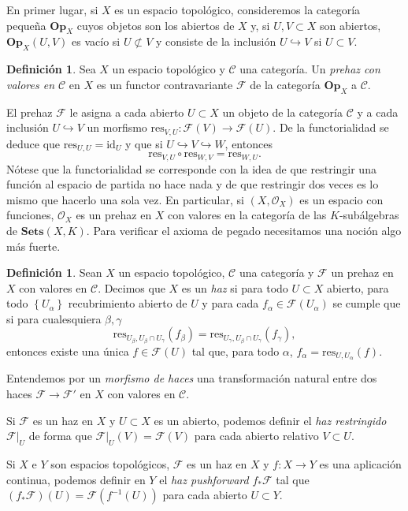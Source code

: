 \documentclass[12pt,a4paper]{article}
\theoremstyle{definition} \newtheorem{defn}[thm]{Definición}
\theoremstyle{definition} \newtheorem{ejemplo}[thm]{Ejemplo}
\theoremstyle{definition} \newtheorem{ejercicio}[thm]{Ejercicio}
\theoremstyle{remark} \newtheorem*{obs}{Observación}
\def\CC{\mathscr{C}}
\def\FF{\mathscr{F}}
\def\res{\mathrm{res}}
\def\OO{\mathscr{O}}
\begin{document}
	En primer lugar, si $X$ es un espacio topológico, consideremos la categoría pequeña $\mathbf{Op}_X$ cuyos objetos son los abiertos de $X$ y, si $U, V \subset X$ son abiertos, $\mathbf{Op}_X(U,V)$ es vacío si $U\not\subset V$ y consiste de la inclusión $U\hookrightarrow V$ si $U\subset V$.
	\begin{defn}
	  Sea $X$ un espacio topológico y $\CC$ una categoría. Un \emph{prehaz con valores en $\CC$} en $X$ es un functor contravariante $\FF$ de la categoría $\mathbf{Op}_X$ a $\CC$. 
	\end{defn}
	El prehaz $\FF$ le asigna a cada abierto $U\subset X$ un objeto de la categoría $\CC$ y a cada inclusión $U\hookrightarrow V$ un morfismo $\res_{V,U}:\FF(V)\rightarrow \FF(U)$. De la functorialidad se deduce que $\res_{U,U}=\mathrm{id}_U$ y que si $U\hookrightarrow V \hookrightarrow W$, entonces 
	\begin{equation*}
	  \res_{V,U}\circ \res_{W,V}=\res_{W,U}.
	\end{equation*}
	Nótese que la functorialidad se corresponde con la idea de que restringir una función al espacio de partida no hace nada y de que restringir dos veces es lo mismo que hacerlo una sola vez. En particular, si $(X,\OO_X)$ es un espacio con funciones, $\OO_X$ es un prehaz en $X$ con valores en la categoría de las $K$-subálgebras de $\mathbf{Sets}(X,K)$. Para verificar el axioma de pegado necesitamos una noción algo más fuerte.
	\begin{defn}
	  Sean $X$ un espacio topológico, $\CC$ una categoría y $\FF$ un prehaz en $X$ con valores en $\CC$. Decimos que $X$ es un \emph{haz} si para todo $U\subset X$ abierto, para todo $\left\{ U_{\alpha} \right\}$ recubrimiento abierto de $U$ y para cada $f_{\alpha}\in \FF(U_{\alpha})$ se cumple que si para cualesquiera $\beta,\gamma$
	  \begin{equation*}
	    \res_{U_{\beta},U_{\beta}\cap U_{\gamma}}(f_{\beta})=\res_{U_{\gamma},U_{\beta}\cap U_{\gamma}}(f_{\gamma}),
	  \end{equation*}
	  entonces existe una única $f\in \FF(U)$ tal que, para todo $\alpha$, $f_{\alpha}=\res_{U,U_{\alpha}}(f)$.

	  Entendemos por un \emph{morfismo de haces} una transformación natural entre dos haces $\FF\rightarrow \FF'$ en $X$ con valores en $\CC$.

	  Si $\FF$ es un haz en $X$ y $U\subset X$ es un abierto, podemos definir el \emph{haz restringido} $\FF|_{U}$ de forma que $\FF|_{U}(V)=\FF(V)$ para cada abierto relativo $V\subset U$.

	  Si $X$ e $Y$ son espacios topológicos, $\FF$ es un haz en $X$ y $f:X\rightarrow Y$ es una aplicación continua, podemos definir en $Y$ el \emph{haz pushforward} $f_*\FF$ tal que $(f_*\FF) (U)=\FF(f^{-1}\left( U \right))$ para cada abierto $U\subset Y$.
	\end{defn}
\end{document}

